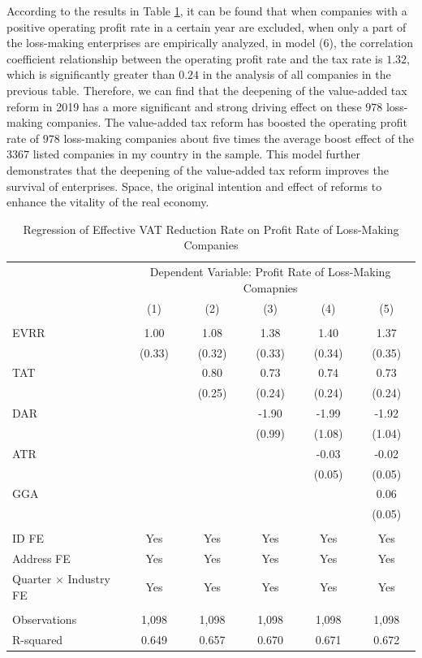 \documentclass[3p,times]{elsarticle}
\begin{document}
According to the results in Table \ref{tab:esti_loss}, it can be found that when companies with a positive operating profit rate in a certain year are excluded, when only a part of the loss-making enterprises are empirically analyzed, in model (6), the correlation coefficient relationship between the operating profit rate and the tax rate is $1.32$, which is significantly greater than $0.24$ in the analysis of all companies in the previous table. Therefore, we can find that the deepening of the value-added tax reform in 2019 has a more significant and strong driving effect on these $978$ loss-making companies. The value-added tax reform has boosted the operating profit rate of $978$ loss-making companies about five times the average boost effect of the $3367$ listed companies in my country in the sample. This model further demonstrates that the deepening of the value-added tax reform improves the survival of enterprises. Space, the original intention and effect of reforms to enhance the vitality of the real economy.

\begin{table}[htp!]
    \centering
  \caption{Regression of Effective VAT Reduction Rate on Profit Rate of Loss-Making Companies}
    \begin{tabular}{l|ccccc}%
    \toprule\toprule
    &\multicolumn{5}{c}{Dependent Variable: Profit Rate of Loss-Making Comapnies}\\
\cline{2-6}
 & (1) & (2) & (3) & (4) & (5) \\
 \hline
 &  &  &  &  &  \\
EVRR&1.00\tnote{***}&	1.08\tnote{***}&	1.38\tnote{***}&	1.40\tnote{***}&	1.37\tnote{***}\\&
(0.33)&	(0.32)&	(0.33)&	(0.34)&	(0.35)\\

TAT&&0.80\tnote{***}&	0.73\tnote{***}&	0.74\tnote{***}&	0.73\tnote{***}\\&&
(0.25)&	(0.24)	&(0.24)&	(0.24)
\\
DAR&&&-1.90\tnote{*}&	-1.99\tnote{*}&	-1.92\tnote{*}\\&&&
(0.99)&	(1.08)&	(1.04)\\
ATR&&&&-0.03&	-0.02\\
&&&&(0.05)&	(0.05)\\
GGA&&&&&0.06\\
&&&&&(0.05)
\\
  &  &  &  &  &  \\
ID FE & Yes & Yes& Yes& Yes& Yes  \\
Address FE & Yes & Yes& Yes& Yes& Yes \\
Quarter $\times$ Industry FE & Yes & Yes& Yes& Yes& Yes  \\
 &  &  &  &  &  \\

Observations  & 1,098 &	1,098 &	1,098 &	1,098 &	1,098
 \\
R-squared &0.649 &	0.657 &	0.670 &	0.671 &	0.672 \\
 \bottomrule
    \end{tabular}
    
    \label{tab:esti_loss}
\end{table}
\end{document}
